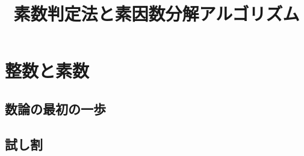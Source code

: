 
\title{素数判定法と素因数分解アルゴリズム}
\author{}
\date{}
\makeindex

\setcounter{notesNum}{1}
\maketitle
\begin{multicols}{2}
\setcounter{tocdepth}{2}
\tableofcontents
\end{multicols}
\newpage

\section{整数と素数}
\subsection{数論の最初の一歩}

\subsection{試し割}


\newpage
\printindex



